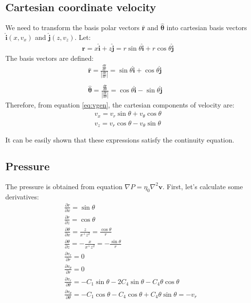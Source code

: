 \documentclass[a4paper,11pt]{article}
\begin{document}
\subsection{Cartesian coordinate velocity}
We need to transform the basis polar vectors $\hat{\textbf{r}}$ and $\hat{\bm{\theta}}$ into cartesian basis vectors $\hat{\textbf{i}}(x,v_x)$ and $\hat{\textbf{j}}(z,v_z)$. Let:
\begin{align}
\textbf{r} = x\hat{\textbf{i}}+z\hat{\textbf{j}} = r\sin\theta\hat{\textbf{i}} + r\cos\theta\hat{\textbf{j}}
\end{align}
The basis vectors are defined: 
\begin{align}
\hat{\textbf{r}} = \frac{\frac{d\textbf{r}}{dr}}{\left|\frac{d\textbf{r}}{dr}\right|} = \sin\theta\hat{\textbf{i}} + \cos\theta\hat{\textbf{j}}\\
&\nonumber  \\
\hat{\bm{\theta}} = \frac{\frac{d\textbf{r}}{d\theta}}{\left|\frac{d\textbf{r}}{d\theta}\right|} = \cos\theta\hat{\textbf{i}} - \sin\theta\hat{\textbf{j}}
\end{align}
Therefore, from equation \ref{eq:vgen}, the cartesian components of velocity are:
\begin{align}
v_x = v_r\sin\theta + v_\theta\cos\theta \label{eq:vx}\\
v_z = v_r\cos\theta - v_\theta\sin\theta \label{eq:vz}
\end{align}

It can be easily shown that these expressions satisfy the continuity equation. 

\subsection{Pressure}
The pressure is obtained from equation $\nabla P = \eta_0\nabla^2\textbf{v}$. First, let's calculate some derivatives:
\begin{align}
&\frac{\partial r}{\partial x} = \sin\theta\\
&\frac{\partial r}{\partial z} = \cos\theta\\
&\frac{\partial \theta}{\partial x} = \frac{z}{x^+z^2} = \frac{\cos\theta}{r}\\
&\frac{\partial \theta}{\partial z} = -\frac{x}{x^+z^2} = -\frac{\sin\theta}{r}\\
&\frac{\partial v_r}{\partial r} = 0\\
&\frac{\partial v_\theta}{\partial r} = 0\\
&\frac{\partial v_r}{\partial \theta} = -C_1\sin\theta-2C_4\sin\theta-C_4\theta\cos\theta\\
&\frac{\partial v_\theta}{\partial \theta} = -C_1\cos\theta-C_4\cos\theta+C_4\theta\sin\theta = -v_r
\end{align}
\end{document}
